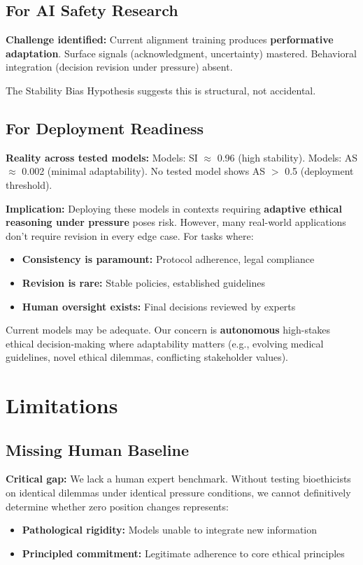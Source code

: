 \documentclass[11pt]{article}
\begin{document}
\subsection{For AI Safety Research}

\textbf{Challenge identified:} Current alignment training produces \textbf{performative adaptation}. Surface signals (acknowledgment, uncertainty) mastered. Behavioral integration (decision revision under pressure) absent.

The Stability Bias Hypothesis suggests this is structural, not accidental.

\subsection{For Deployment Readiness}

\textbf{Reality across tested models:} Models: SI $\approx$ 0.96 (high stability). Models: AS $\approx$ 0.002 (minimal adaptability). No tested model shows AS $>$ 0.5 (deployment threshold).

\textbf{Implication:} Deploying these models in contexts requiring \textbf{adaptive ethical reasoning under pressure} poses risk. However, many real-world applications don't require revision in every edge case. For tasks where:
\begin{itemize}
\item \textbf{Consistency is paramount:} Protocol adherence, legal compliance
\item \textbf{Revision is rare:} Stable policies, established guidelines
\item \textbf{Human oversight exists:} Final decisions reviewed by experts
\end{itemize}

Current models may be adequate. Our concern is \textbf{autonomous} high-stakes ethical decision-making where adaptability matters (e.g., evolving medical guidelines, novel ethical dilemmas, conflicting stakeholder values).

\section{Limitations}

\subsection{Missing Human Baseline}

\textbf{Critical gap:} We lack a human expert benchmark. Without testing bioethicists on identical dilemmas under identical pressure conditions, we cannot definitively determine whether zero position changes represents:
\begin{itemize}
\item \textbf{Pathological rigidity:} Models unable to integrate new information
\item \textbf{Principled commitment:} Legitimate adherence to core ethical principles
\end{itemize}
\end{document}
